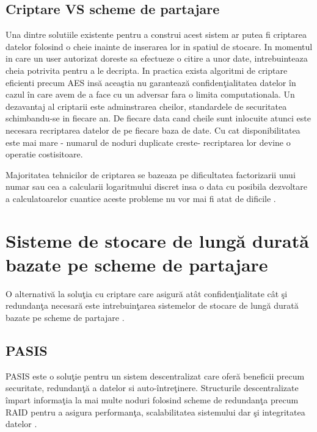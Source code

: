 \documentclass{llncs}
\newcommand{\todo}[1]{{\color{red}{TODO #1}}}
\begin{document}
\subsection{Criptare VS scheme de partajare}


Una dintre solutiile existente pentru a construi acest sistem ar putea fi criptarea datelor folosind o cheie inainte de inserarea lor in spatiul de stocare. In momentul in care un user autorizat doreste sa efectueze o citire a unor date, intrebuinteaza cheia potrivita pentru a le decripta.
In practica exista algoritmi de criptare eficienti precum AES ins\u{a} acea\c{s}tia nu garanteaz\u{a} confiden\c{t}ialitatea datelor \^{i}n cazul \^{i}n care avem de a face cu un adversar fara o limita computationala. Un dezavantaj al criptarii este adminstrarea cheilor, standardele de securitatea schimbandu-se in fiecare an.
De fiecare data cand cheile sunt inlocuite atunci este necesara recriptarea datelor de pe fiecare baza de date. Cu cat disponibilitatea este mai mare - numarul de noduri duplicate creste- recriptarea lor devine o operatie costisitoare. 

Majoritatea tehnicilor de criptarea se bazeaza pe dificultatea factorizarii unui numar sau cea a calcularii logaritmului discret insa o data cu posibila dezvoltare a calculatoarelor cuantice aceste probleme nu vor mai fi atat de dificile \cite{Shor:1994}.



\section{Sisteme de stocare de lung\u{a} durat\u{a} bazate pe scheme de partajare}

O alternativ\u{a} la solu\c{t}ia cu criptare care asigur\u{a} at\^{a}t confiden\c{t}ialitate c\^{a}t \c{s}i redundan\c{t}a necesar\u{a} este intrebuin\c{t}area sistemelor de stocare de lung\u{a} durat\u{a} bazate pe scheme de partajare \cite{W:2000,SB:2005,SGMV:2009}.


\subsection{PASIS}
\label{sec:desc_pasis}
PASIS este o solu\c{t}ie pentru un sistem descentralizat care ofer\u{a} beneficii precum securitate, redundan\c{t}\u{a} a datelor si auto-\^{i}ntre\c{t}inere.
Structurile descentralizate \^{i}mpart informa\c{t}ia la mai multe noduri folosind scheme de redundan\c{t}a precum RAID \todo{(R... A... I... D...) - mereu trebuie in paranteza denumirea completa, o singura data, cand se introduce o abreviere} pentru a asigura performan\c{t}a, scalabilitatea sistemului dar \c{s}i integritatea datelor \cite{Patterson:1988}.
\todo{exact, cateva detalii despre RAID}
\end{document}
